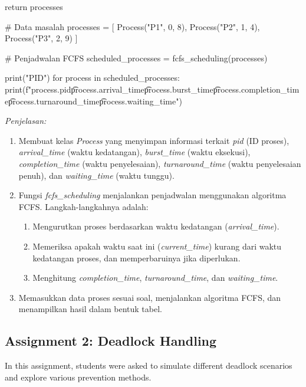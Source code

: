 \documentclass[12pt]{article}
\begin{document}
\begin{enumerate}
\begin{python}
    return processes

# Data masalah
processes = [
    Process("P1", 0, 8),
    Process("P2", 1, 4),
    Process("P3", 2, 9)
]

# Penjadwalan FCFS
scheduled_processes = fcfs_scheduling(processes)

print("PID\tArrival\tBurst\tCompletion\tTurnaround\tWaiting")
for process in scheduled_processes:
    print(f"{process.pid}\t{process.arrival_time}\t{process.burst_time}\t{process.completion_time}\t{process.turnaround_time}\t{process.waiting_time}")
\end{python}

\textit{Penjelasan:}
\begin{enumerate}
    \item Membuat kelas \textit{Process} yang menyimpan informasi terkait \textit{pid} (ID proses), \textit{arrival\_time} (waktu kedatangan), \textit{burst\_time} (waktu eksekusi), \textit{completion\_time} (waktu penyelesaian), \textit{turnaround\_time} (waktu penyelesaian penuh), dan \textit{waiting\_time} (waktu tunggu).
    \item Fungsi \textit{fcfs\_scheduling} menjalankan penjadwalan menggunakan algoritma FCFS. Langkah-langkahnya adalah:
        \begin{enumerate}
            \item Mengurutkan proses berdasarkan waktu kedatangan (\textit{arrival\_time}).
            \item Memeriksa apakah waktu saat ini (\textit{current\_time}) kurang dari waktu kedatangan proses, dan memperbaruinya jika diperlukan.
            \item Menghitung \textit{completion\_time}, \textit{turnaround\_time}, dan \textit{waiting\_time}.
        \end{enumerate}
    \item Memasukkan data proses sesuai soal, menjalankan algoritma FCFS, dan menampilkan hasil dalam bentuk tabel.
\end{enumerate}
\end{enumerate}


\subsection{Assignment 2: Deadlock Handling}
In this assignment, students were asked to simulate different deadlock scenarios and explore various prevention methods.
\end{document}
